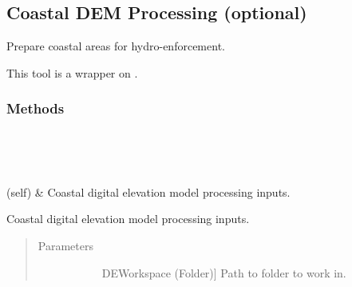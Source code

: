 \documentclass[letterpaper,10pt,english]{sphinxmanual}
\begin{document}
\subsection{Coastal DEM Processing (optional)}
\label{\detokenize{StreamStats_DataPrep:coastal-dem-processing-optional}}

\begin{fulllineitems}
\label{\detokenize{StreamStats_DataPrep:StreamStats_DataPrep.CoastalDEM}}
Prepare coastal areas for hydro-enforcement.

This tool is a wrapper on {\hyperref[\detokenize{make_hydrodem:make_hydrodem.coastaldem}]{}}.
\subsubsection*{Methods}


\begin{savenotes}\sphinxatlongtablestart\begin{longtable}{}
\hline

\endfirsthead

%
{}\\
\hline

\endhead

\hline
{}\\
\endfoot

\endlastfoot

{\hyperref[\detokenize{StreamStats_DataPrep:StreamStats_DataPrep.CoastalDEM.getParameterInfo}]{}}(self)
&
Coastal digital elevation model processing inputs.
\\
\hline
\end{longtable}\sphinxatlongtableend\end{savenotes}

\begin{fulllineitems}
\label{\detokenize{StreamStats_DataPrep:StreamStats_DataPrep.CoastalDEM.getParameterInfo}}
Coastal digital elevation model processing inputs.
\begin{quote}\begin{description}
\item[{Parameters}] \leavevmode\begin{description}
\item[{}] \leavevmode{[}DEWorkspace (Folder){]}
Path to folder to work in.


\end{description}
\end{description}
\end{quote}
\end{fulllineitems}
\end{fulllineitems}
\end{document}
